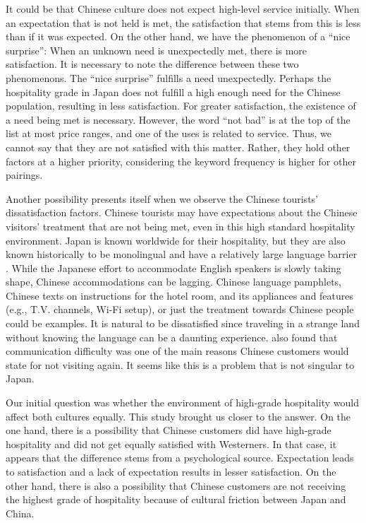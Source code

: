 \documentclass[smallextended,natbib]{svjour3}       %
\begin{document}
    It could be that Chinese culture does not expect high-level service initially. When an expectation that is not held is met, the satisfaction that stems from this is less than if it was expected. On the other hand, we have the phenomenon of a ``nice surprise'': When an unknown need is unexpectedly met, there is more satisfaction. It is necessary to note the difference between these two phenomenons. The ``nice surprise'' fulfills a need unexpectedly. Perhaps the hospitality grade in Japan does not fulfill a high enough need for the Chinese population, resulting in less satisfaction. For greater satisfaction, the existence of a need being met is necessary. However, the word ``not bad'' is at the top of the list at most price ranges, and one of the uses is related to service. Thus, we cannot say that they are not satisfied with this matter. Rather, they hold other factors at a higher priority, considering the keyword frequency is higher for other pairings.

    Another possibility presents itself when we observe the Chinese tourists’ dissatisfaction factors. Chinese tourists may have expectations about the Chinese visitors' treatment that are not being met, even in this high standard hospitality environment. Japan is known worldwide for their hospitality, but they are also known historically to be monolingual and have a relatively large language barrier \cite[][]{heinrich2012making,coulmas2002japan}. While the Japanese effort to accommodate English speakers is slowly taking shape, Chinese accommodations can be lagging. Chinese language pamphlets, Chinese texts on instructions for the hotel room, and its appliances and features (e.g., T.V. channels, Wi-Fi setup), or just the treatment towards Chinese people could be examples. It is natural to be dissatisfied since traveling in a strange land without knowing the language can be a daunting experience. \cite{ryan2001} also found that communication difficulty was one of the main reasons Chinese customers would state for not visiting again. It seems like this is a problem that is not singular to Japan.

    Our initial question was whether the environment of high-grade hospitality would affect both cultures equally. This study brought us closer to the answer. On the one hand, there is a possibility that Chinese customers did have high-grade hospitality and did not get equally satisfied with Westerners. In that case, it appears that the difference stems from a psychological source. Expectation leads to satisfaction and a lack of expectation results in lesser satisfaction. On the other hand, there is also a possibility that Chinese customers are not receiving the highest grade of hospitality because of cultural friction between Japan and China.
\end{document}
